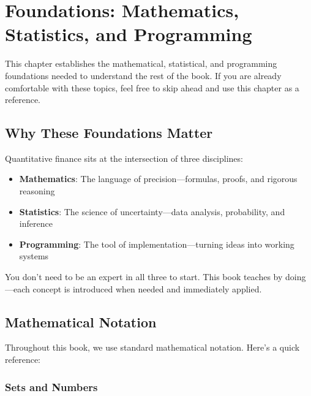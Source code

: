 \chapter{Foundations: Mathematics, Statistics, and Programming}
\label{ch:foundations}

This chapter establishes the mathematical, statistical, and programming
foundations needed to understand the rest of the book. If you are already
comfortable with these topics, feel free to skip ahead and use this chapter
as a reference.

\section{Why These Foundations Matter}

Quantitative finance sits at the intersection of three disciplines:

\begin{itemize}
    \item \textbf{Mathematics}: The language of precision---formulas, proofs,
      and rigorous reasoning
    \item \textbf{Statistics}: The science of uncertainty---data analysis,
      probability, and inference
    \item \textbf{Programming}: The tool of implementation---turning ideas
      into working systems
\end{itemize}


You don't need to be an expert in all three to start. This book teaches by
doing---each concept is introduced when needed and immediately applied.

\section{Mathematical Notation}

Throughout this book, we use standard mathematical notation. Here's a quick
reference:

\subsection{Sets and Numbers}

